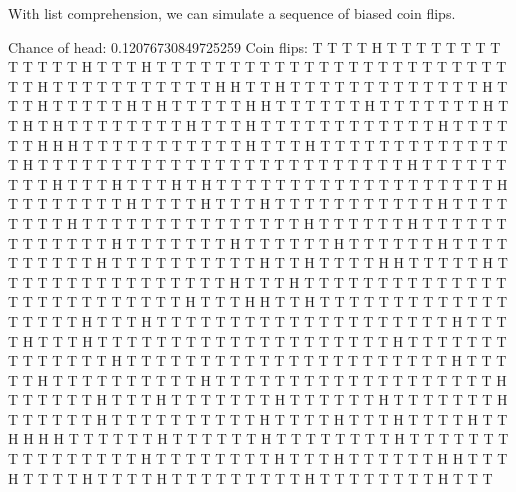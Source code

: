 \documentclass[letterpaper,10pt,english]{sphinxmanual}
\begin{document}
With list comprehension, we can simulate a sequence of biased coin flips.

\begin{sphinxVerbatim}[commandchars=\\\{\}]
     
    
  \PYG{p}{[}          \PYG{p}{]}
 
\end{sphinxVerbatim}

\begin{sphinxVerbatim}[commandchars=\\\{\}]
Chance of head: 0.12076730849725259
Coin flips: T T T T H T T T T T T T T T T T T T H T T T H T T T T T T T T T T T T T T T T T T T T T T T T T T H T T T T T T T T T T T H H T T H T T T T T T T T T T T T T H T T T H T T T T T H T H T T T T T H H T T T T T T H T T T T T T T H T T H T H T T T T T T T T H T T T H T T T T T T T T T T T T H T T T T T T H H H T T T T T T T T T T T H T T T H T T T T T T T T T T T T T T H T T T T T T T T T T T T T T T T T T T T T T T T T H T T T T T T T T T H T T T H T T T H T H T T T T T T T T T T T T T T T T T T T H T T T T T T T T H T T T T H T T T H T T T T T T T T T T T H T T T T T T T T H T T T T T T T T T T T T T T T H T T T T T T H T T T T T T T T T T T T T H T T T T T T T H T T T T T T H T T T T T T H T T T T T T T T T T H T T T T T T T T T T H T T H T T T T H H T T T T T H T T T T T T T T T T T T T T T T H T T T H T T T T T T T T T T T T T T T T T T T T T T T T T T H T T T H H T T H T T T T T T T T T T T T T T T T T T H T T T H T T T T T T T T T T T T T T T T T T T T H T T T T H T T T H T T T T T T T T T T T T T T T T T T T T H T T T T T T T T T T T T T T H T T T T T T T T T T T T T T T T T T T T T T H T T T T T H T T T T T T T T T T H T T T T T T T T T T T T T T T T T T T H T T T T T T H T T T H T T T T T T T H T T T T T T H T T T T T T T H T T T T T T H T T T T T T T T T T H T T T T H T T T H T T T T H T T H H H H T T T T T T H T T T T T T H T T T T T T T T H T T T T T T T T T T T T T T T T H T T T T T T T T H T T T H T T T T T T H H T T T H T T T T H T T T T H T T T T T T T T T H T T T T T T T T H T T T 
\end{sphinxVerbatim}
\end{document}
